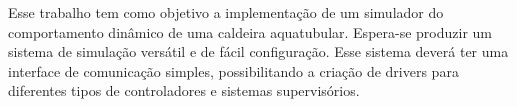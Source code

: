 Esse trabalho tem como objetivo a implementação de um simulador do
comportamento dinâmico de uma caldeira aquatubular. Espera-se produzir
um sistema de simulação versátil e de fácil configuração. Esse sistema
deverá ter uma interface de comunicação simples, possibilitando a
criação de drivers para diferentes tipos de controladores e sistemas
supervisórios.
